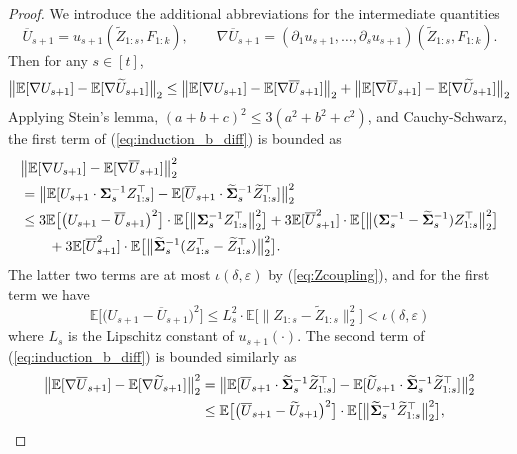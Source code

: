 \documentclass[10pt,reqno]{amsart}
\def\E{\mathbb{E}}
\def\eps{\varepsilon}
\begin{document}
\begin{proof}
We introduce the additional abbreviations for the intermediate quantities
\[\overline U_{s+1}=u_{s+1}(\widetilde Z_{1:s},F_{1:k}),
\qquad \nabla \overline U_{s+1}=(\partial_1 u_{s+1},\ldots,\partial_s
u_{s+1})(\widetilde Z_{1:s},F_{1:k}).\]
Then for any $s \in [t]$,
\begin{equation}\label{eq:induction_b_diff}
\big\|\mathbb{E}[\nabla U_{s+1}] - \mathbb{E}[\nabla\widetilde U_{s+1}]\big\|_2 
\leq \big\|\mathbb{E}[\nabla U_{s+1}] - \mathbb{E}[\nabla \overline U_{s+1}]\big\|_2
+ \big\|\mathbb{E}[\nabla \overline U_{s+1}] - \mathbb{E}[\nabla \widetilde U_{s+1}]\big\|_2
\end{equation}
Applying Stein's lemma, $(a+b+c)^2 \leq 3(a^2+b^2+c^2)$, and Cauchy-Schwarz,
the first term of (\ref{eq:induction_b_diff}) is bounded as
\begin{align*}
&\big\|\EE[\nabla U_{s+1}] - \EE[\nabla \overline U_{s+1}]\big\|_2^2\\
&=\big\|\EE[U_{s+1} \cdot \bSigma_s^{-1} Z_{1:s}^\top]
- \EE[\overline U_{s+1} \cdot \widetilde \bSigma_s^{-1} \widetilde Z_{1:s}^\top]
\big\|_2^2\\
&\leq 3\E\big[\big(U_{s+1}-\overline U_{s+1}\big)^2\big] \cdot
\E\big[\big\|\bSigma_s^{-1}Z_{1:s}^\top\big\|_2^2\big]
+3\E[\overline U_{s+1}^2] \cdot
\E\big[\big\|(\bSigma_s^{-1}-\widetilde \bSigma_s^{-1})Z_{1:s}^\top\big\|_2^2\big]\\
&\qquad+3\E[\overline U_{s+1}^2] \cdot 
\E\big[\big\|\widetilde \bSigma_s^{-1}(Z_{1:s}^\top-\widetilde
Z_{1:s}^\top)\big\|_2^2\big].
\end{align*}
The latter two terms are at most $\iota(\delta,\eps)$ by (\ref{eq:Zcoupling}),
and for the first term we have
\begin{equation}\label{eq:barcompare}
\E\big[\big(U_{s+1}-\overline U_{s+1}\big)^2\big]
\leq L_s^2 \cdot \E\big[\big\|Z_{1:s}-\widetilde Z_{1:s}\big\|_2^2\big]
<\iota(\delta,\eps)
\end{equation}
where $L_s$ is the Lipschitz constant of $u_{s+1}(\cdot)$. The second term of 
(\ref{eq:induction_b_diff}) is bounded similarly as
\begin{align*}
\big\|\EE[\nabla \overline U_{s+1}] - \EE[\nabla \widetilde U_{s+1}]\big\|_2^2
&=\big\|\EE[\overline U_{s+1} \cdot \widetilde \bSigma_s^{-1} \widetilde Z_{1:s}^\top]
- \EE[\widetilde  U_{s+1} \cdot \widetilde \bSigma_s^{-1} \widetilde Z_{1:s}^\top]
\big\|_2^2\\
&\leq \E\big[\big(\overline U_{s+1}-\widetilde U_{s+1}\big)^2\big] \cdot
\E\big[\big\|\widetilde \bSigma_s^{-1} \widetilde Z_{1:s}^\top\big\|_2^2\big],

\end{align*}
\end{proof}
\end{document}
